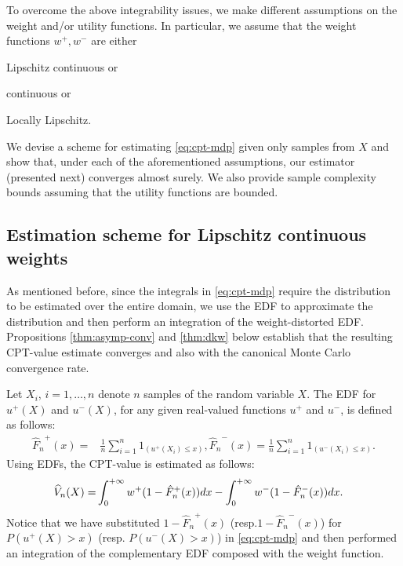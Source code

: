 \documentclass[11pt,letterpaper,english]{article}
\begin{document}
To overcome the above integrability issues, we make different assumptions on the weight and/or utility functions. In particular, we assume that the weight functions $w^+, w^-$ are either 
\begin{inparaenum}[\bfseries (i)]
\item Lipschitz continuous or
\item \holder continuous or
\item Locally Lipschitz.
\end{inparaenum}
We devise a scheme for estimating \eqref{eq:cpt-mdp} given only samples from $X$ and show that, under each of the aforementioned assumptions, our estimator (presented next) converges almost surely. 
We also provide sample complexity bounds assuming that the utility functions are bounded.

\subsection{Estimation scheme for Lipschitz continuous weights}
As mentioned before, since the integrals in \eqref{eq:cpt-mdp} require the distribution to be estimated over the entire domain, we use the EDF to approximate the distribution and then perform an integration of the weight-distorted EDF. Propositions \ref{thm:asymp-conv} and \ref{thm:dkw} below establish that the resulting CPT-value estimate converges and also with the canonical Monte Carlo convergence rate. 

Let $X_i$, $i=1,\ldots,n$ denote $n$ samples of the random variable $X$. %
The EDF for $u^+(X)$ and $u^-(X)$, for any given real-valued functions $u^+$ and $u^-$, is defined as follows: 
\begin{align}
{\hat F_n}^+(x)=&\frac{1}{n} \sum_{i=1}^n 1_{(u^+(X_i) \leq x)}, 
{\hat F_n}^-(x)=\frac{1}{n} \sum_{i=1}^n 1_{(u^-(X_i) \leq x)}.
\label{eq:edf}
\end{align}
Using EDFs, the CPT-value is estimated as follows:
\begin{align}
\widehat V_n(X) =& \int_0^{+\infty} w^+(1-{\hat F_n}^+(x))  dx - \int_0^{+\infty} w^-(1-{\hat F_n}^-(x))  dx.\label{eq:cpt-est}
\end{align}
Notice that we have substituted $1-{\hat F_n}^+(x)$ (resp.$1-{\hat F_n}^-(x)$)  for $P(u^+(X)>x)$ (resp. $P(u^-(X)>x)$) in \eqref{eq:cpt-mdp} and then performed an integration of the complementary EDF composed with the weight function. 
\end{document}
